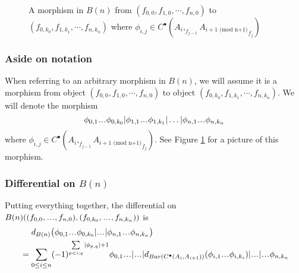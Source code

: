\begin{figure}
\centerline{}
\caption{A morphism in $B(n)$
from $(f_{0,0}, f_{1,0}, \cdots, f_{n,0})$ to  
$(f_{0,k_0}, f_{1,k_1}, \cdots, f_{n,k_n})$ where
$\phi_{i,j} \in C^\bullet(A_i, _{f_{j-1}}{A_{i+1 \textrm{ (mod n+1)}}}_{f_j})$}
 \label{fig:phi}
\end{figure}
%
\subsubsection{Aside on notation} \label{sec:phi_notation}
When referring to an arbitrary morphism in $B(n)$,
we will assume it is a morphism from object $(f_{0,0}, f_{1,0}, \cdots, f_{n,0})$ 
to object $(f_{0,k_0}, f_{1,k_1}, \cdots, f_{n,k_n})$.
We will denote the morphism 
$$\phi_{0,1}\smdots\phi_{0,k_0} | 
\phi_{1,1}\smdots\phi_{1,k_1} | \dots |
\phi_{n,1}\smdots\phi_{n,k_n}$$ 
where $\phi_{i,j} \in C^\bullet(A_i, _{f_{j-1}}
{A_{i+1 \textrm{ (mod n+1)}}}_{f_j})$. 
See Figure \ref{fig:phi} for a picture of 
this morphism.
%
\subsubsection{Differential on $B(n)$}
Putting everything together, 
the differential on \newline $B(n)(
(f_{0,0}, \smdots, f_{n,0}), 
(f_{0,k_0}, \smdots, f_{n,k_n}))$ is
\begin{align*}
&\phantom{{}={}}
d_{B(n)} \big(
  \phi_{0,1}\smdots\phi_{0,k_0} | \smdots |
  \phi_{n,1}\smdots\phi_{n,k_n} \big)\\
&= 
\sum \limits_{0 \leq i \leq n}
  (-1)^{\sum \limits_{p<i;q}
  |\phi_{p,q}|+1}
  \phi_{0,1}\smdots | \smdots |
  d_{Bar(C^\bullet(A_i, A_{i+1}))} 
  (\phi_{i,1}\smdots\phi_{i,k_i}) | \smdots |
  \smdots\phi_{n,k_n} 
\end{align*}
%
